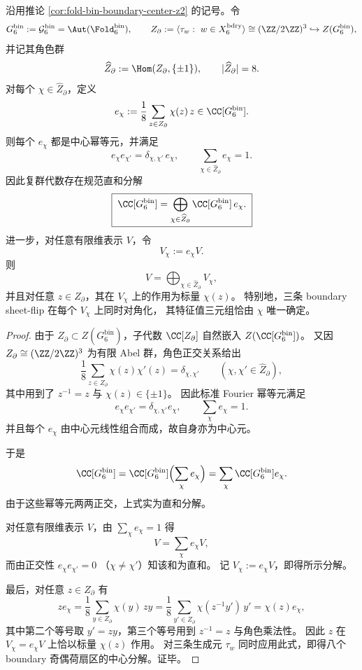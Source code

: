 \begin{proposition}\label{prop:xi-window6-boundary-eight-sector-central-decomposition}
沿用推论 \ref{cor:fold-bin-boundary-center-z2} 的记号。令
\[
G_6^{\mathrm{bin}}:=\mathcal G_6^{\mathrm{bin}}=\Aut(\Fold_6^{\mathrm{bin}}),
\qquad
Z_{\partial}:=\langle \tau_w:\ w\in X_6^{\mathrm{bdry}}\rangle
\cong (\ZZ/2\ZZ)^3
\hookrightarrow Z(G_6^{\mathrm{bin}}),
\]
并记其角色群
\[
\widehat Z_{\partial}:=\Hom(Z_{\partial},\{\pm1\}),
\qquad
|\widehat Z_{\partial}|=8.
\]
对每个 \(\chi\in \widehat Z_{\partial}\)，定义
\[
e_\chi:=\frac1{8}\sum_{z\in Z_{\partial}}\chi(z)\,z\in \CC[G_6^{\mathrm{bin}}].
\]
则每个 \(e_\chi\) 都是中心幂等元，并满足
\[
e_\chi e_{\chi'}=\delta_{\chi,\chi'}\,e_\chi,
\qquad
\sum_{\chi\in\widehat Z_{\partial}} e_\chi=1.
\]
因此复群代数存在规范直和分解
\[
\boxed{\;
\CC[G_6^{\mathrm{bin}}]
=
\bigoplus_{\chi\in\widehat Z_{\partial}}
\CC[G_6^{\mathrm{bin}}]\,e_\chi.\;}
\]
进一步，对任意有限维表示 \(V\)，令
\[
V_\chi:=e_\chi V.
\]
则
\[
\boxed{\;
V=\bigoplus_{\chi\in\widehat Z_{\partial}}V_\chi,\;}
\]
并且对任意 \(z\in Z_{\partial}\)，其在 \(V_\chi\) 上的作用为标量 \(\chi(z)\)。
特别地，三条 boundary sheet-flip 在每个 \(V_\chi\) 上同时对角化，
其特征值三元组恰由 \(\chi\) 唯一确定。
\end{proposition}
\begin{proof}
由于 \(Z_{\partial}\subset Z(G_6^{\mathrm{bin}})\)，子代数
\(
\CC[Z_{\partial}]
\)
自然嵌入
\(
Z(\CC[G_6^{\mathrm{bin}}])
\)。
又因 \(Z_{\partial}\cong(\ZZ/2\ZZ)^3\) 为有限 Abel 群，角色正交关系给出
\[
\frac1{8}\sum_{z\in Z_{\partial}}\chi(z)\chi'(z)
=
\delta_{\chi,\chi'}
\qquad
(\chi,\chi'\in \widehat Z_{\partial}),
\]
其中用到了 \(z^{-1}=z\) 与 \(\chi(z)\in\{\pm1\}\)。
因此标准 Fourier 幂等元满足
\[
e_\chi e_{\chi'}=\delta_{\chi,\chi'}e_\chi,
\qquad
\sum_{\chi}e_\chi=1.
\]
并且每个 \(e_\chi\) 由中心元线性组合而成，故自身亦为中心元。
\par
于是
\[
\CC[G_6^{\mathrm{bin}}]
=
\CC[G_6^{\mathrm{bin}}]\Bigl(\sum_{\chi}e_\chi\Bigr)
=
\sum_{\chi}\CC[G_6^{\mathrm{bin}}]e_\chi.
\]
由于这些幂等元两两正交，上式实为直和分解。
\par
对任意有限维表示 \(V\)，由
\(
\sum_\chi e_\chi=1
\)
得
\[
V=\sum_\chi e_\chi V,
\]
而由正交性
\(
e_\chi e_{\chi'}=0
\)
（\(\chi\neq\chi'\)）知该和为直和。
记 \(V_\chi:=e_\chi V\)，即得所示分解。
\par
最后，对任意 \(z\in Z_{\partial}\) 有
\[
ze_\chi
=
\frac1{8}\sum_{y\in Z_{\partial}}\chi(y)\,zy
=
\frac1{8}\sum_{y'\in Z_{\partial}}\chi(z^{-1}y')\,y'
=
\chi(z)e_\chi,
\]
其中第二个等号取 \(y'=zy\)，第三个等号用到 \(z^{-1}=z\) 与角色乘法性。
因此 \(z\) 在 \(V_\chi=e_\chi V\) 上恰以标量 \(\chi(z)\) 作用。
对三条生成元 \(\tau_w\) 同时应用此式，即得八个 boundary 奇偶荷扇区的中心分解。证毕。
\end{proof}

